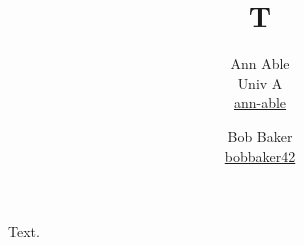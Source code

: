 \documentclass{article}
\title{T}
\author{Ann Able \\ Univ A \\ \href{https://annable.com}{ann-able} \and Bob Baker \\ \href{https://www.bobbaker42.com}{bobbaker42}}
\begin{document}
\maketitle
Text.
\end{document}

